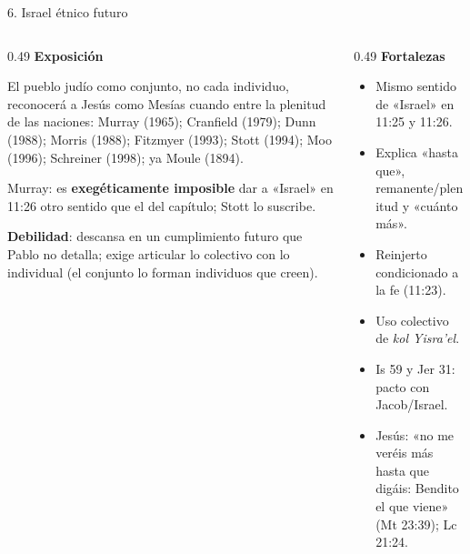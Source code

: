 \documentclass[hyperref={bookmarks=false},aspectratio=169]{beamer}
\begin{document}
\begin{frame}{6. Israel étnico futuro}
\begin{columns}[T,onlytextwidth]
\begin{column}{0.49\textwidth}\small\RaggedRight
\textbf{\textcolor{cafe}{Exposición}}\par
El pueblo judío como conjunto, no cada individuo, reconocerá a Jesús como Mesías cuando entre la plenitud de las naciones: Murray (1965); Cranfield (1979); Dunn (1988); Morris (1988); Fitzmyer (1993); Stott (1994); Moo (1996); Schreiner (1998); ya Moule (1894).\par\smallskip
{\scriptsize Murray: es \textbf{exegéticamente imposible} dar a «Israel» en 11:26 otro sentido que el del capítulo; Stott lo suscribe.}\par\smallskip
\textbf{\textcolor{cafe}{Debilidad}}: descansa en un cumplimiento futuro que Pablo no detalla; exige articular lo colectivo con lo individual (el conjunto lo forman individuos que creen).
\end{column}
\begin{column}{0.49\textwidth}\scriptsize\RaggedRight
\textbf{\textcolor{ladrillo}{Fortalezas}}
\begin{itemize}
\item Mismo sentido de «Israel» en 11:25 y 11:26.
\item Explica «hasta que», remanente/plenitud y «cuánto más».
\item Reinjerto condicionado a la fe (11:23).
\item Uso colectivo de \emph{kol Yisra'el}.
\item Is 59 y Jer 31: pacto con Jacob/Israel.
\item Jesús: «no me veréis más hasta que digáis: Bendito el que viene» (Mt 23:39); Lc 21:24.
\end{itemize}
\end{column}
\end{columns}
\end{frame}
\end{document}

